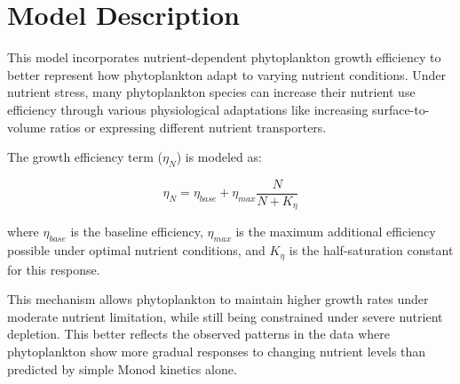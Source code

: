 \section{Model Description}

This model incorporates nutrient-dependent phytoplankton growth efficiency to better represent how phytoplankton adapt to varying nutrient conditions. Under nutrient stress, many phytoplankton species can increase their nutrient use efficiency through various physiological adaptations like increasing surface-to-volume ratios or expressing different nutrient transporters.

The growth efficiency term ($\eta_N$) is modeled as:

\[ \eta_N = \eta_{base} + \eta_{max} \frac{N}{N + K_{\eta}} \]

where $\eta_{base}$ is the baseline efficiency, $\eta_{max}$ is the maximum additional efficiency possible under optimal nutrient conditions, and $K_{\eta}$ is the half-saturation constant for this response.

This mechanism allows phytoplankton to maintain higher growth rates under moderate nutrient limitation, while still being constrained under severe nutrient depletion. This better reflects the observed patterns in the data where phytoplankton show more gradual responses to changing nutrient levels than predicted by simple Monod kinetics alone.
